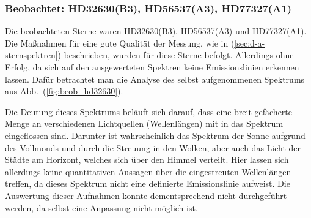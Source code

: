 \subsubsection{Beobachtet: HD32630(B3), HD56537(A3), HD77327(A1)} \label{sec:beobachtet}
Die beobachteten Sterne waren HD32630(B3), HD56537(A3) und HD77327(A1).
Die Maßnahmen für eine gute Qualität der Messung, wie in (\ref{sec:d-a-sternspektren}) beschrieben, wurden für diese Sterne befolgt.
Allerdings ohne Erfolg, da sich auf den ausgewerteten Spektren keine Emissionslinien erkennen lassen.
Dafür betrachtet man die Analyse des selbst aufgenommenen Spektrums aus Abb.\ (\ref{fig:beob_hd32630}).

Die Deutung dieses Spektrums beläuft sich darauf, dass eine breit gefächerte Menge an verschiedenen Lichtquellen (Wellenlängen) mit in das Spektrum eingeflossen sind.
Darunter ist wahrscheinlich das Spektrum der Sonne aufgrund des Vollmonds und durch die Streuung in den Wolken, aber auch das Licht der Städte am Horizont, welches sich über den Himmel verteilt. 
Hier lassen sich allerdings keine quantitativen Aussagen über die eingestreuten Wellenlängen treffen, da dieses Spektrum nicht eine definierte Emissionslinie aufweist.
Die Auswertung dieser Aufnahmen konnte dementsprechend nicht durchgeführt werden, da selbst eine Anpassung nicht möglich ist.
